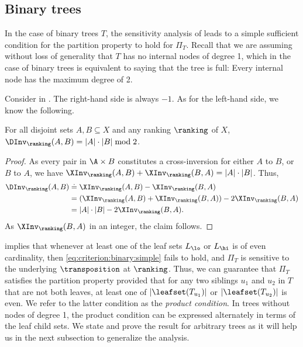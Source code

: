 \documentclass{toc}
\begin{document}
\subsection{Binary trees}
\label{sec:connectivity:binary}

In the case of binary trees $T$, the sensitivity analysis of  leads to a simple sufficient condition for the partition property to hold for $\Pi_T$.
Recall that we are assuming without loss of generality that $T$ has no internal nodes of degree 1, which in the case of binary trees is equivalent to saying that the tree is full: Every internal node has the maximum degree of 2. 

Consider  in . The right-hand side is always $-1$. As for the left-hand side, we know the following.
\begin{fact}\label{fact:DInv:parity}
For all disjoint sets $A, B \subseteq X$ and any ranking $\ranking$ of $X$, $\DInv_\ranking(A,B) = |A| \cdot |B| \bmod 2$. 
\end{fact}
\begin{proof}
As every pair in $\A \times B$ constitutes a cross-inversion for either $A$ to $B$, or $B$ to $A$, we have 
$\XInv_\ranking(A,B) + \XInv_\ranking(B,A) = |A| \cdot |B|$.
%
Thus,
\begin{align}
\DInv_\ranking(A,B) 
& \doteq  \XInv_\ranking(A,B) - \XInv_\ranking(B,A) \nonumber \\
& = (\XInv_\ranking(A,B) + \XInv_\ranking(B,A)) - 2 \XInv_\ranking(B,A) \nonumber \\
& = |A| \cdot |B| - 2 \XInv_\ranking(B,A). \label{eq:DInv:as:XInv}
\end{align}
As $\XInv_\ranking(B,A)$ in an integer, the claim follows.
\end{proof}
 implies that whenever at least one of the leaf sets $L_\lo$ or $L_\hi$ is of even cardinality, then \eqref{eq:criterion:binary:simple} fails to hold, and $\Pi_T$ is sensitive to the underlying $\transposition$ at $\ranking$. Thus, we can guarantee that $\Pi_T$ satisfies the partition property provided that for any two siblings $u_1$ and $u_2$ in $T$ that are not both leaves, at least one of $\lvert\leafset(T_{u_1})\rvert$ or $\lvert\leafset(T_{u_2})\rvert$ is even. We refer to the latter condition as the \emph{product condition}. In trees without nodes of degree 1, the product condition can be expressed alternately in terms of the leaf child sets. We state and prove the result for arbitrary trees as it will help us in the next subsection to generalize the analysis.
\end{document}
